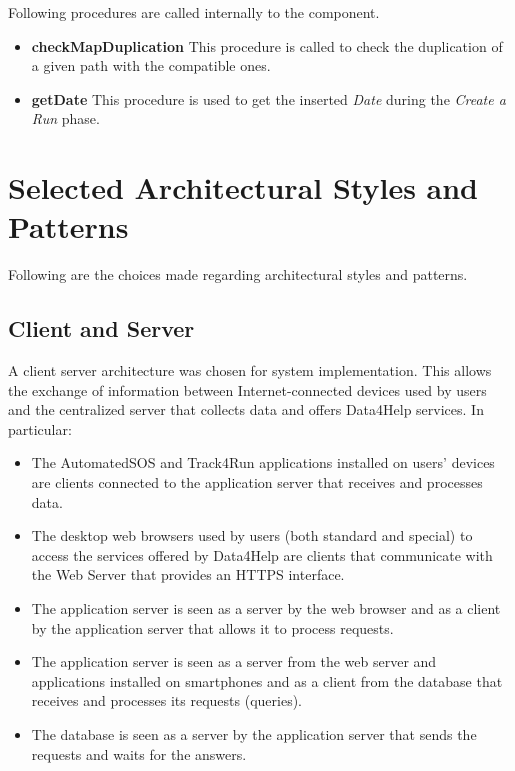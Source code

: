 \myparagraph{}
Following procedures are called internally to the component.
\begin{itemize}
  \item \textbf{checkMapDuplication} \quad This procedure is called to check the duplication of a given path with the compatible ones.

  \item \textbf{getDate} \quad This procedure is used to get the inserted \textit{Date} during the \textit{Create a Run} phase.
\end{itemize}


\section{Selected Architectural Styles and Patterns}\label{architecturalStyle}
Following are the choices made regarding architectural styles and patterns.

\subsection{Client and Server}
A client server architecture was chosen for system implementation.
This allows the exchange of information between Internet-connected devices used by users and the centralized server that collects data and offers Data4Help services.
In particular:
\begin{itemize}
  \item The AutomatedSOS and Track4Run applications installed on users' devices are clients connected to the application server that receives and processes data.
  \item The desktop web browsers used by users (both standard and special) to access the services offered by Data4Help are clients that communicate with the Web Server that provides an HTTPS interface.
  \item The application server is seen as a server by the web browser and as a client by the application server that allows it to process requests.
  \item The application server is seen as a server from the web server and applications installed on smartphones and as a client from the database that receives and processes its requests (queries).
  \item The database is seen as a server by the application server that sends the requests and waits for the answers.
\end{itemize}

